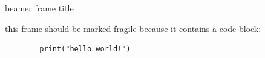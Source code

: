 

\begin{frame}[fragile]{beamer frame title}

    this frame should be marked fragile because it contains a code block:

    \begin{verbatim}
        print("hello world!")
    \end{verbatim}

\end{frame}